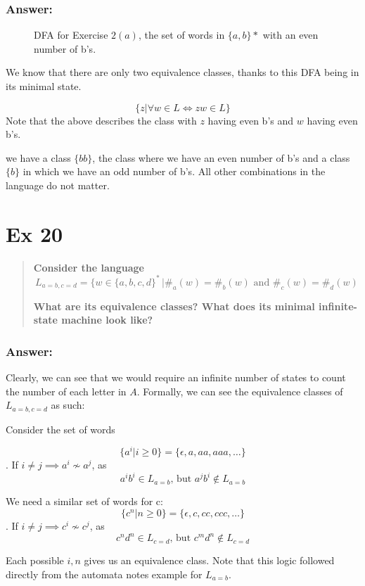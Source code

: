 \documentclass[titlepage]{article}\usepackage[]{graphicx}\usepackage[]{color}
\begin{document}
\subsubsection{Answer:}
  \begin{figure}[htp]
    \centering
    \caption{DFA for Exercise $2(a)$, the set of words in $\{a,b\}* $ with an
            even number of b's.}
  \end{figure}

  We know that there are only two equivalence classes, thanks to this DFA being
  in its minimal state. 

  \[ \{ z | \forall w \in L \Leftrightarrow zw \in L \} \]
  Note that the above describes the class with $z$ having even b's and $w$
  having even b's. 

  we have a class $\{bb\}$, the class where we have an even number of b's and a
  class $\{b\}$ in which we have an odd number of b's. All other combinations
  in the language do not matter.


\section*{Ex 20}
\begin{quote}
  \textbf{Consider the language}
  \[ L_{a=b,c=d } = \{ w \in \{a,b, c ,d \}^* \, | \#_a (w) = \#_b (w) \text{ and }
    \#_c (w) = \#_d (w )
  \]
  
\textbf{What are its equivalence classes? What does its minimal infinite-state machine
look like?}
\end{quote}

\subsubsection{Answer:}
Clearly, we can see that we would require an infinite number of states to
count the number of each letter in $A$. Formally, we can see the equivalence
classes of $L_{a=b,c=d}$ as such:

Consider the set of words

\[ \{ a^i | i \geq 0 \} = \{ \epsilon, a, aa, aaa, \dots\} \]. 
If $i \neq j \implies a^i \not \sim a^j$, as 
\[ a^ib^i \in L_{a=b} \text{, but } a^jb^i \notin L_{a=b} \]

We need a similar set of words for c:
\[ \{ c^n | n \geq 0 \} = \{ \epsilon, c, cc, ccc, \dots\} \]. 
If $i \neq j \implies c^i \not \sim c^j$, as 
\[ c^nd^n \in L_{c=d} \text{, but } c^md^n \notin L_{c=d} \]

Each possible $i,n$ gives us an equivalence class. Note that this logic
followed directly from the automata notes example for $L_{a=b}$.
\end{document}
